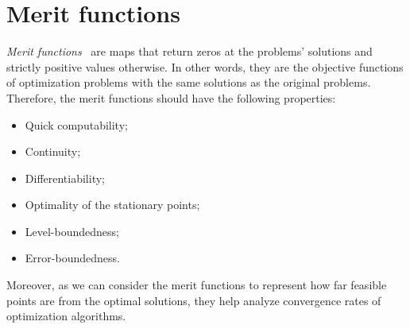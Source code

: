 \documentclass[../../main]{subfiles}
\begin{document}
\section{Merit functions} 
\emph{Merit functions}~\cite{Fukushima1996} are maps that return zeros at the problems' solutions and strictly positive values otherwise.
In other words, they are the objective functions of optimization problems with the same solutions as the original problems.
Therefore, the merit functions should have the following properties:
\begin{itemize}
    \item Quick computability;
    \item Continuity;
    \item Differentiability;
    \item Optimality of the stationary points;
    \item Level-boundedness;
    \item Error-boundedness.
\end{itemize}
Moreover, as we can consider the merit functions to represent how far feasible points are from the optimal solutions, they help analyze convergence rates of optimization algorithms.




\end{document}
